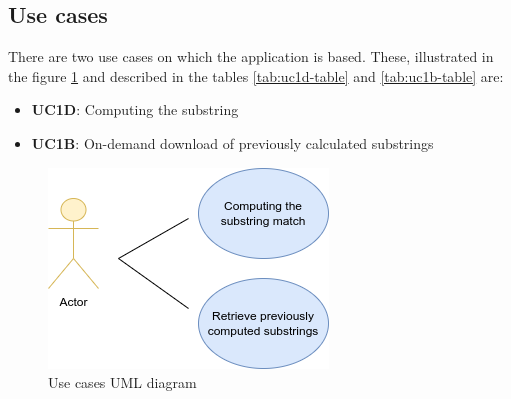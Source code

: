 \documentclass[a4paper,10pt, titlepage]{article}
\begin{document}
\subsection{Use cases}
There are two use cases on which the application is based. These, illustrated in the figure \ref{fig:ucdiag} and described in the tables \ref{tab:uc1d-table} and \ref{tab:uc1b-table} are:
\begin{itemize}
	\item \textbf{UC1D}: Computing the substring
	\item \textbf{UC1B}: On-demand download of previously calculated substrings
\end{itemize}
\begin{figure}[H]
	\centering
	\includegraphics[width=0.4\linewidth]{figures/ucdiag.png}
	\caption{Use cases UML diagram}
	\label{fig:ucdiag}
\end{figure}
\end{document}
